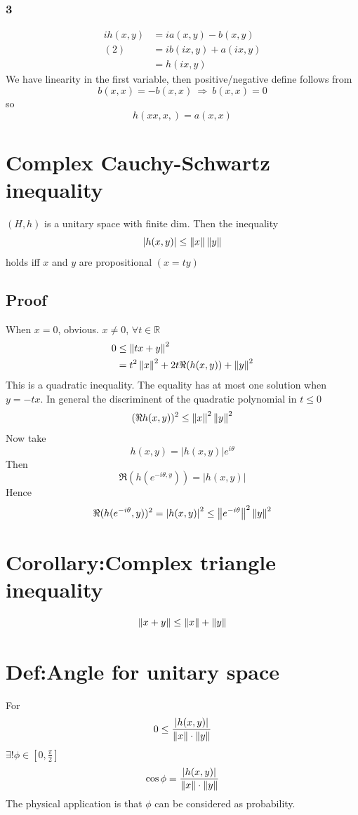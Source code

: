 \documentclass{book}
\newcommand{\abs}[1]{\left\lvert #1 \right\rvert}
\begin{document}
\subsubsection{3}
$$\begin{aligned}
    ih(x,y)&=ia(x,y)-b(x,y)\\
    (2)&=ib(ix,y)+a(ix,y)\\
    &=h(ix,y)    
\end{aligned}$$
We have linearity in the first variable, then positive/negative define follows from $$b(x,x)=-b(x,x)\ \Rightarrow\ b(x,x)=0$$ so $$h(xx,x,)=a(x,x)$$
\section{Complex Cauchy-Schwartz inequality}
$(H,h)$ is a unitary space with finite dim. Then the inequality$$\abs{h(x,y)}\leq\norm{x}\norm{y}$$holds iff $x$ and $y$ are propositional $(x=ty)$
\subsection*{Proof}
When $x=0$, obvious. $x\neq 0$, $\forall t\in \mathbb{R}$$$
\begin{aligned}
0 &\leq\left\lVert tx+y \right\rVert^2\\
&=t^2\left\lVert x \right\rVert^2+2t\Re (h(x,y))+\left\lVert y \right\rVert^2
\end{aligned}$$
This is a quadratic inequality. The equality has at most one solution when $y=-tx$. In general the discriminent of the quadratic polynomial in $t\leq 0$$$(\Re h(x,y))^2\leq\left\lVert x \right\rVert^2\left\lVert y \right\rVert^2$$
Now take $$h(x,y)=\abs{h(x,y)}e^{i\theta}$$
Then$$\Re (h(e^{-i\theta,y}))=\abs{h(x,y)}$$
Hence
$$\Re (h(e^{-i\theta},y))^2=\abs{h(x,y)}^2\leq\norm{e^{-i\theta}}^2\norm{y}^2$$
\section{Corollary:Complex triangle inequality}$$\left\lVert x+y \right\rVert\leq\left\lVert x \right\rVert+\left\lVert y \right\rVert$$
\section{Def:Angle for unitary space}
For $$0\leq\frac{\abs{h(x,y)}}{\norm{x}\cdot\norm{y}}$$
$\exists !\phi\in [0,\frac{\pi}{2}]$$$\cos\phi=\frac{\abs{h(x,y)}}{\norm{x}\cdot\norm{y}}$$
The physical application is that $\phi$ can be considered as probability.
\end{document}
